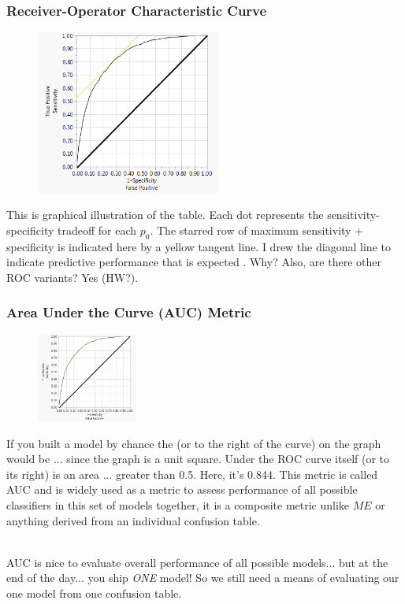 \documentclass[handout]{beamer}
\begin{document}
\begin{frame}\frametitle{Receiver-Operator Characteristic Curve}

\vspace{-0.2cm}
\begin{figure}
\centering
\hspace{-0.5cm}\includegraphics[width=2.4in]{roc_curve.png}
\end{figure}

\small
\vspace{-0.3cm}
This is graphical illustration of the table. Each dot represents the sensitivity-specificity tradeoff for each $p_0$. \pause The starred row of maximum sensitivity + specificity is indicated here by a yellow tangent line. \pause I drew the diagonal line to indicate predictive performance that is expected . Why? \pause Also, are there other ROC variants? \pause Yes (HW?).

\end{frame}


\begin{frame}\frametitle{Area Under the Curve (AUC) Metric}

\vspace{-0.2cm}
\begin{figure}
\centering
\hspace{-0.5cm}\includegraphics[width=1.3in]{roc_curve.png}
\end{figure}

\small
\vspace{-0.3cm}
If you built a model by chance the  (or to the right of the curve) on the graph would be ...  since the graph is a unit square. Under the ROC curve itself (or to its right) is an area ... \pause greater than 0.5. Here, it's 0.844. \pause This metric is called AUC and is widely used as a metric to assess performance of all possible classifiers in this set of models together, it is a composite metric unlike $ME$ or anything derived from an individual confusion table.\\~\\ \pause

AUC is nice to evaluate overall performance of all possible models... but at the end of the day... \pause you ship \emph{ONE} model! \pause So we still need a means of evaluating our one model from one confusion table.

\end{frame}
\end{document}
